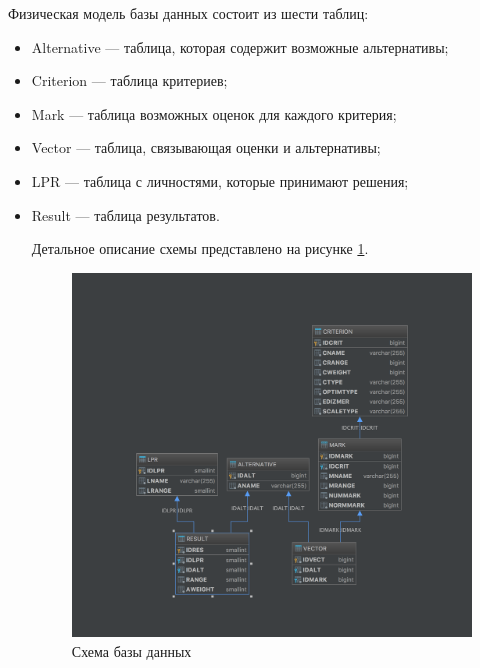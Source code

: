 \documentclass[titlepage]{article}
\begin{document}
Физическая модель базы данных состоит из шести таблиц:
\begin{itemize}
\item Alternative --- таблица, которая содержит возможные альтернативы;
\item Criterion --- таблица критериев;
\item Mark --- таблица возможных оценок для каждого критерия;
\item Vector --- таблица, связывающая оценки и альтернативы;
\item LPR --- таблица с личностями, которые принимают решения;
\item Result --- таблица результатов.

Детальное описание схемы представлено на рисунке \ref{fig:schema}.

\begin{figure}[h]
\centering
\includegraphics[scale=0.4]{schema}
\caption{Схема базы данных}
\label{fig:schema}
\end{figure}
\end{itemize}
\end{document}
